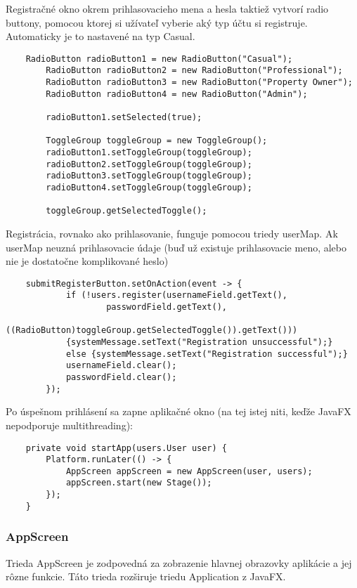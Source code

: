 \documentclass{article}
\begin{document}
Registračné okno okrem prihlasovacieho mena a hesla taktiež vytvorí radio buttony, pomocou ktorej si užívateľ vyberie aký typ účtu si registruje. Automaticky je to nastavené na typ Casual.
\begin{verbatim}
    RadioButton radioButton1 = new RadioButton("Casual");
        RadioButton radioButton2 = new RadioButton("Professional");
        RadioButton radioButton3 = new RadioButton("Property Owner");
        RadioButton radioButton4 = new RadioButton("Admin");

        radioButton1.setSelected(true);

        ToggleGroup toggleGroup = new ToggleGroup();
        radioButton1.setToggleGroup(toggleGroup);
        radioButton2.setToggleGroup(toggleGroup);
        radioButton3.setToggleGroup(toggleGroup);
        radioButton4.setToggleGroup(toggleGroup);
        
        toggleGroup.getSelectedToggle();
\end{verbatim}
Registrácia, rovnako ako prihlasovanie, funguje pomocou triedy userMap. Ak userMap neuzná prihlasovacie údaje (buď už existuje prihlasovacie meno, alebo nie je dostatočne komplikované heslo)
\begin{verbatim}
    submitRegisterButton.setOnAction(event -> {
            if (!users.register(usernameField.getText(),
                    passwordField.getText(),
                    ((RadioButton)toggleGroup.getSelectedToggle()).getText()))
            {systemMessage.setText("Registration unsuccessful");}
            else {systemMessage.setText("Registration successful");}
            usernameField.clear();
            passwordField.clear();
        });
\end{verbatim}

Po úspešnom prihlásení sa zapne aplikačné okno (na tej istej niti, keďže JavaFX nepodporuje multithreading):
\begin{verbatim}
    private void startApp(users.User user) {
        Platform.runLater(() -> {
            AppScreen appScreen = new AppScreen(user, users);
            appScreen.start(new Stage());
        });
    }
\end{verbatim}

\subsubsection{AppScreen}
Trieda AppScreen je zodpovedná za zobrazenie hlavnej obrazovky aplikácie a jej rôzne funkcie. Táto trieda rozširuje triedu Application z JavaFX.
\end{document}
